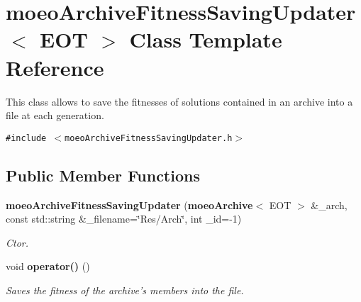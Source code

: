 \section{moeo\-Archive\-Fitness\-Saving\-Updater$<$ EOT $>$ Class Template Reference}
\label{classmoeoArchiveFitnessSavingUpdater}
This class allows to save the fitnesses of solutions contained in an archive into a file at each generation.  


{\tt \#include $<$moeo\-Archive\-Fitness\-Saving\-Updater.h$>$}

\subsection*{Public Member Functions}
\begin{CompactItemize}
\item 
{\bf moeo\-Archive\-Fitness\-Saving\-Updater} ({\bf moeo\-Archive}$<$ EOT $>$ \&\_\-arch, const std::string \&\_\-filename=\char`\"{}Res/Arch\char`\"{}, int \_\-id=-1)
\begin{CompactList}\small\item\em Ctor. \item\end{CompactList}\item 
void {\bf operator()} ()\label{classmoeoArchiveFitnessSavingUpdater_2ad5d3ab2c2066a1a3b85fff2ac14a19}

\begin{CompactList}\small\item\em Saves the fitness of the archive's members into the file. \item\end{CompactList}\end{CompactItemize}
